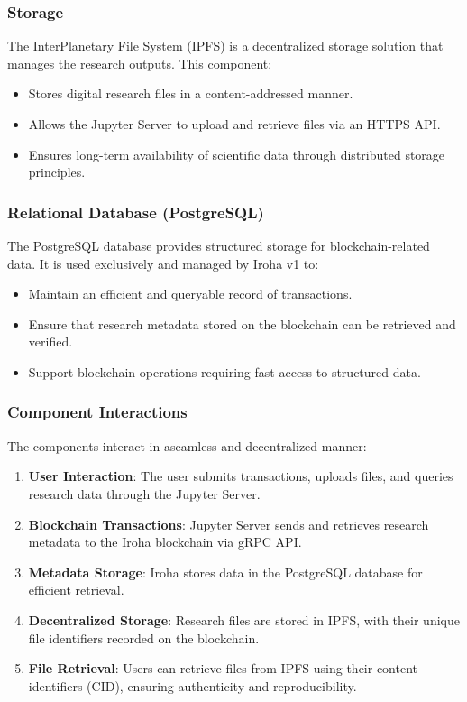 \documentclass[final]{rc-book-2.14}
\begin{document}
\subsubsection{Storage}
The InterPlanetary File System (IPFS) is a decentralized storage solution that manages the research outputs. This component:
\begin{itemize}
    \item Stores digital research files in a content-addressed manner.
    \item Allows the Jupyter Server to upload and retrieve files via an HTTPS API.
    \item Ensures long-term availability of scientific data through distributed storage principles.
\end{itemize}


\subsubsection{Relational Database (PostgreSQL)}
The PostgreSQL database provides structured storage for blockchain-related data. It is used exclusively and managed by Iroha v1 to:
\begin{itemize}
    \item Maintain an efficient and queryable record of transactions.
    \item Ensure that research metadata stored on the blockchain can be retrieved and verified.
    \item Support blockchain operations requiring fast access to structured data.
\end{itemize}

\subsubsection{Component Interactions}
The components interact in aseamless and decentralized manner:
\begin{enumerate}
    \item \textbf{User Interaction}: The user submits transactions, uploads files, and queries research data through the Jupyter Server.
    \item \textbf{Blockchain Transactions}: Jupyter Server sends and retrieves research metadata to the Iroha blockchain via gRPC API.
    \item \textbf{Metadata Storage}: Iroha stores data in the PostgreSQL database for efficient retrieval.
    \item \textbf{Decentralized Storage}: Research files are stored in IPFS, with their unique file identifiers recorded on the blockchain.
    \item \textbf{File Retrieval}: Users can retrieve files from IPFS using their content identifiers (CID), ensuring authenticity and reproducibility.
\end{enumerate}
\end{document}
